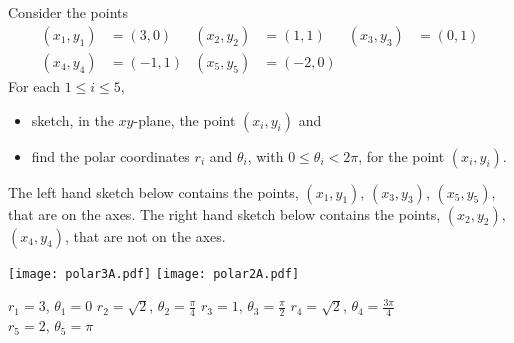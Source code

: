 
\newcommand{\he}{\hat{\mathbf{e}}}



\subsection*{\Conceptual}


\begin{question}
Consider the points
\begin{align*}
(x_1,y_1) &= (3,0) &
(x_2,y_2) &= (1,1)  &
(x_3,y_3) &= (0,1) \\
(x_4,y_4) &= (-1,1) &
(x_5,y_5) &= (-2,0)
\end{align*}
For each $1\le i\le 5$, 
\begin{itemize}
\item
sketch, in the $xy$-plane, the point $(x_i,y_i)$ and
\item
find the polar coordinates $r_i$ and $\theta_i$,
with $0\le\theta_i<2\pi$, for the point $(x_i,y_i)$.
\end{itemize}
\end{question}


\begin{answer} 
The left hand sketch below contains the points, $(x_1,y_1)$, $(x_3,y_3)$,
$(x_5,y_5)$, that are on the axes. The right hand sketch below contains the
points, $(x_2,y_2)$, $(x_4,y_4)$, that are not on the axes.
\begin{center}
  \texttt{[image: polar3A.pdf]}\quad
  \texttt{[image: polar2A.pdf]}
\end{center}
    $r_1 = 3$,        $\theta_1=0$\qquad 
    $r_2 = \sqrt{2}$, $\theta_2=\frac{\pi}{4}$\qquad 
    $r_3 = 1$,        $\theta_3=\frac{\pi}{2}$\qquad 
    $r_4 = \sqrt{2}$, $\theta_4=\frac{3\pi}{4}$\\
    $r_5 = 2$,        $\theta_5=\pi$
\end{answer}


